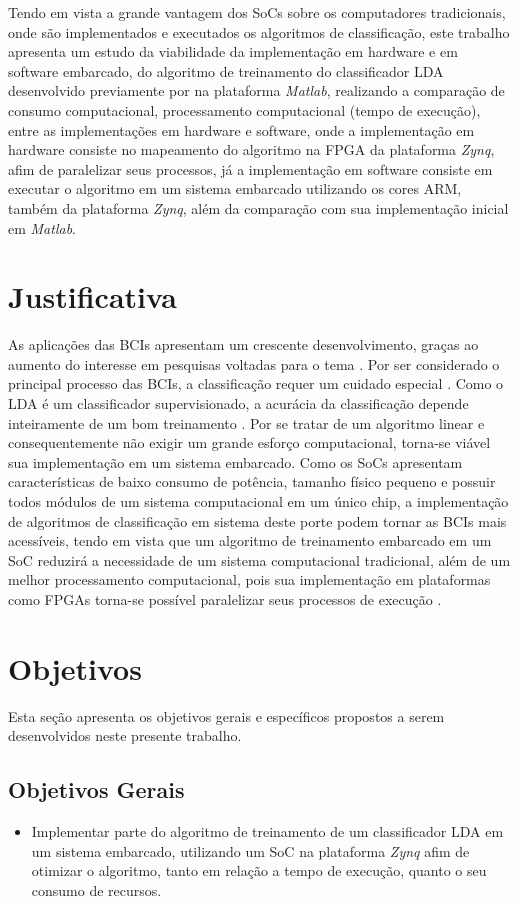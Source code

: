 Tendo em vista a grande vantagem dos SoCs sobre os computadores tradicionais, onde são implementados e executados os algoritmos de classificação, este trabalho apresenta um estudo da viabilidade da implementação em hardware e em software embarcado, do algoritmo de treinamento do classificador LDA desenvolvido previamente por \cite{F.Lotte} na plataforma \textit{Matlab}, realizando a comparação de consumo computacional, processamento computacional (tempo de execução), entre as implementações em hardware e software, onde a implementação em hardware consiste no mapeamento do algoritmo na FPGA da plataforma \textit{Zynq}, afim de paralelizar seus processos, já a implementação em software consiste em executar o algoritmo em um sistema embarcado utilizando os cores ARM, também da plataforma \textit{Zynq}, além da comparação com sua implementação inicial em \textit{Matlab}.


\section{Justificativa}
As aplicações das BCIs apresentam um crescente desenvolvimento, graças ao aumento do interesse em pesquisas voltadas para o tema \cite{BCICompetition} . Por ser considerado o principal processo das BCIs, a classificação requer um cuidado especial \cite{MasonAndBirch}. Como o LDA é um classificador supervisionado, a acurácia da classificação depende inteiramente de um bom treinamento \cite{F.Lotte}. Por se tratar de um algoritmo linear e consequentemente não exigir um grande esforço computacional, torna-se viável sua implementação em um sistema embarcado. Como os SoCs apresentam características de baixo consumo de potência, tamanho físico pequeno e possuir todos módulos de um sistema computacional em um único chip, a implementação de algoritmos de classificação em sistema deste porte podem tornar as BCIs mais acessíveis, tendo em vista que um algoritmo de treinamento embarcado em um SoC reduzirá a necessidade de um sistema computacional tradicional, além de um melhor processamento computacional, pois sua implementação em plataformas como FPGAs torna-se possível paralelizar seus processos de execução \cite{zynqBook}.

\section{Objetivos}
Esta seção apresenta os objetivos gerais e específicos propostos a serem desenvolvidos neste
 presente trabalho.
\subsection{Objetivos Gerais}
\begin{itemize}
	\item Implementar parte do algoritmo de treinamento de um classificador LDA em um sistema embarcado, utilizando um SoC na plataforma \textit{Zynq} afim de otimizar o algoritmo, tanto em relação a tempo de execução, quanto o seu consumo de recursos.
\end{itemize} 
